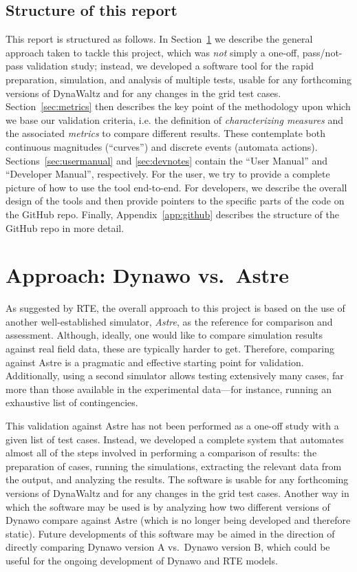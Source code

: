 \documentclass[11pt, a4paper, twoside, titlepage]{article}
\begin{document}
\subsection{Structure of this report}
This report is structured as follows. In Section~\ref{sec:approach} we
describe the general approach taken to tackle this project, which was
\emph{not} simply a one-off, pass/not-pass validation study; instead,
we developed a software tool for the rapid preparation, simulation,
and analysis of multiple tests, usable for any forthcoming versions of
DynaWaltz and for any changes in the grid test cases.
Section~\ref{sec:metrics} then describes the key point of the
methodology upon which we base our validation criteria, i.e. the
definition of \emph{characterizing measures} and the associated
\emph{metrics} to compare different results. These contemplate both
continuous magnitudes (``curves'') and discrete events (automata
actions).  Sections~\ref{sec:usermanual} and \ref{sec:devnotes}
contain the ``User Manual'' and ``Developer Manual'',
respectively. For the user, we try to provide a complete picture of
how to use the tool end-to-end. For developers, we describe the
overall design of the tools and then provide pointers to the specific
parts of the code on the GitHub repo. Finally,
Appendix~\ref{app:github} describes the structure of the GitHub repo
in more detail.




\section{Approach: Dynawo vs.\ Astre}
\label{sec:approach}

As suggested by RTE, the overall approach to this project is based on
the use of another well-established simulator, \emph{Astre}, as the
reference for comparison and assessment. Although, ideally, one would
like to compare simulation results against real field data, these are
typically harder to get. Therefore, comparing against Astre is a
pragmatic and effective starting point for validation. Additionally,
using a second simulator allows testing extensively many cases, far
more than those available in the experimental data---for instance,
running an exhaustive list of contingencies.

This validation against Astre has not been performed as a one-off
study with a given list of test cases. Instead, we developed a
complete system that automates almost all of the steps involved in
performing a comparison of results: the preparation of cases, running
the simulations, extracting the relevant data from the output, and
analyzing the results.  The software is usable for any forthcoming
versions of DynaWaltz and for any changes in the grid test cases.
Another way in which the software may be used is by analyzing how two
different versions of Dynawo compare against Astre (which is no longer
being developed and therefore static).  Future developments of this
software may be aimed in the direction of directly comparing Dynawo
version A vs.\ Dynawo version B, which could be useful for the ongoing
development of Dynawo and RTE models.
\end{document}

